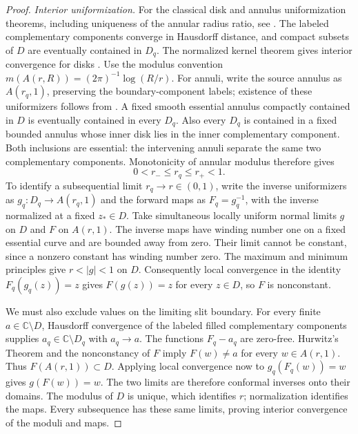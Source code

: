 \begin{proof}
\emph{Interior uniformization.}
For the classical disk and annulus uniformization theorems, including
uniqueness of the annular radius ratio, see
\cite[Theorems~1.2.1 and~1.3.1]{Papamichael2008}.
The labeled complementary components converge in Hausdorff distance,
and compact subsets of $D$ are eventually contained in $D_q$.
The normalized kernel theorem gives interior convergence for disks
\cite[Definition~2.8 and Theorem~2.9]{CarmonaFedorovskiy2024}.
Use the modulus convention $m(A(r,R))=(2\pi)^{-1}\log(R/r)$.
For annuli, write the source annulus as $A(r_q,1)$, preserving the
boundary-component labels; existence of these uniformizers follows
from \cite[Theorem~1.3.1]{Papamichael2008}. A fixed smooth essential annulus compactly
contained in $D$ is eventually contained in every $D_q$.  Also every
$D_q$ is contained in a fixed bounded annulus whose inner disk lies in
the inner complementary component. Both inclusions are essential:
the intervening annuli separate the same two complementary components.
Monotonicity of annular modulus
\cite[Proposition~4.3.5 and Section~4.3.4]{Beliaev2015}
therefore gives
\[
                 0<r_-\le r_q\le r_+<1.
\]
To identify a subsequential limit $r_q\to r\in(0,1)$, write the inverse
uniformizers as $g_q:D_q\to A(r_q,1)$ and the forward maps as
$F_q=g_q^{-1}$, with the inverse normalized at a fixed $z_*\in D$.
Take simultaneous locally uniform normal limits $g$ on $D$ and $F$
on $A(r,1)$.  The inverse maps have winding number one on a fixed
essential curve and are bounded away from zero.  Their limit cannot
be constant, since a nonzero constant has winding number zero.
The maximum and minimum principles give $r<|g|<1$ on $D$.
Consequently local convergence in the identity
$F_q(g_q(z))=z$ gives $F(g(z))=z$ for every $z\in D$, so $F$ is
nonconstant.

We must also exclude values on the limiting slit boundary.  For every
finite $a\in\mathbb C\setminus D$, Hausdorff convergence of the
labeled filled complementary components supplies
$a_q\in\mathbb C\setminus D_q$ with $a_q\to a$.
The functions $F_q-a_q$ are zero-free.  Hurwitz's Theorem and the
nonconstancy of $F$ imply $F(w)\ne a$ for every $w\in A(r,1)$.
Thus $F(A(r,1))\subset D$.  Applying local convergence now to
$g_q(F_q(w))=w$ gives $g(F(w))=w$.  The two limits are therefore
conformal inverses onto their domains.  The modulus of $D$ is unique,
which identifies $r$; normalization identifies the maps.  Every
subsequence has these same limits, proving interior convergence of
the moduli and maps.


\end{proof}
